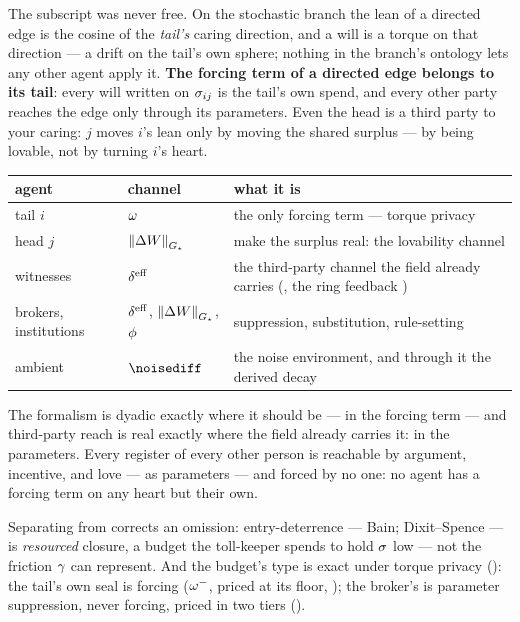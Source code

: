 \documentclass[../main]{subfiles}
\begin{document}
\begin{theorem}
  The subscript was never free. On the stochastic branch the lean of a directed edge is
  the cosine of the \emph{tail's} caring direction, and a will is a torque on that
  direction --- a drift on the tail's own sphere; nothing in the branch's ontology lets
  any other agent apply it. \textbf{The forcing term of a directed edge belongs to its
  tail}: every will written on $\sigma\sb{ ij }$ is the tail's own spend, and every
  other party reaches the edge only through its parameters. Even the head is a third
  party to your caring: $j$ moves $i$'s lean only by moving the shared surplus --- by
  being lovable, not by turning $i$'s heart.
\end{theorem}

\begin{table}[htbp]
  \centering
  \begin{tabularx}{\textwidth}{@{} l l L @{}}
    \toprule
    \textbf{agent} & \textbf{channel} & \textbf{what it is} \\
    \midrule
    tail $i$ & $\omega$ & the only forcing term --- torque privacy \\
    \addlinespace
    head $j$ & $\left\lVert \Delta W \right\rVert\sb{ \ensuremath{G\sb{\star}} }$ & make the surplus real: the lovability channel \\
    \addlinespace
    witnesses & $\effdensity$ & the third-party channel the field already carries
      (, the ring feedback ) \\
    \addlinespace
    brokers, institutions & $\effdensity$, $\left\lVert \Delta W \right\rVert\sb{ \ensuremath{G\sb{\star}} }$, $\phi$ &
      suppression, substitution, rule-setting \\
    \addlinespace
    ambient & $\noisediff$ & the noise environment, and through it the derived decay \\
    \bottomrule
  \end{tabularx}
\end{table}

The formalism is dyadic exactly where it should be --- in the forcing term --- and
third-party reach is real exactly where the field already carries it: in the
parameters. Every register of every other person is reachable by argument, incentive,
and love --- as parameters --- and forced by no one: no agent has a forcing term on any
heart but their own.

\begin{econ}[label=e:closure, title={Resourced closure is not friction}, ref=w:anti,
  cites={a:bain}, departs=annex,
  stopsat={entry-deterrence is a spent budget, not the decay constant $\decayrate$}]
  Separating  from  corrects an omission: entry-deterrence ---
  Bain; Dixit--Spence \parencite{a:bain} --- is \emph{resourced} closure, a budget the
  toll-keeper spends to hold
  $\sigma$ low --- not the friction $\decayrate$ can represent. And the budget's type
  is exact under torque privacy (): the tail's own seal is forcing
  ($\omega\sp{-}$, priced at its floor, ); the broker's is parameter
  suppression, never forcing, priced in two tiers ().
\end{econ}
\end{document}
